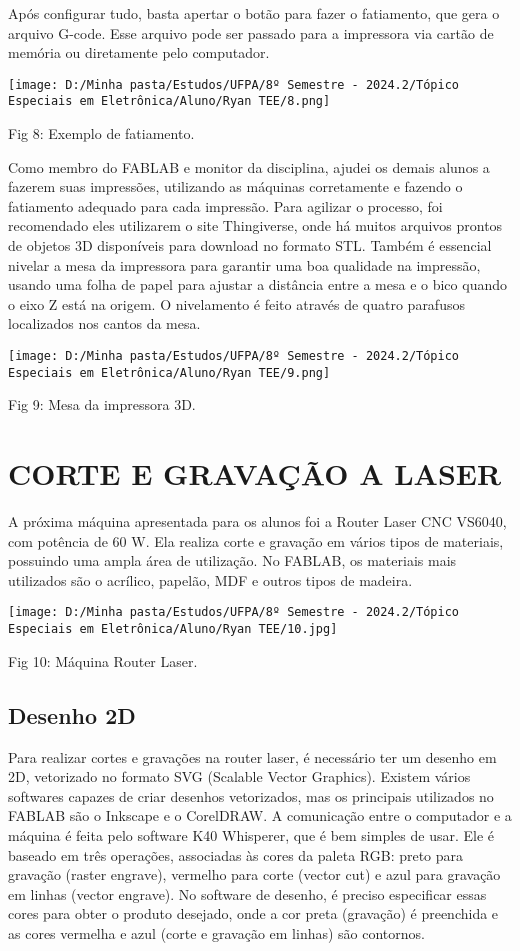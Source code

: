 \documentclass[
]{book}
\begin{document}
Após configurar tudo, basta apertar o botão para fazer o fatiamento, que gera o arquivo G-code. Esse arquivo pode ser passado para a impressora via cartão de memória ou diretamente pelo computador.

\texttt{[image: D:/Minha pasta/Estudos/UFPA/8º Semestre - 2024.2/Tópico Especiais em Eletrônica/Aluno/Ryan TEE/8.png]}

Fig 8: Exemplo de fatiamento.

Como membro do FABLAB e monitor da disciplina, ajudei os demais alunos a fazerem suas impressões, utilizando as máquinas corretamente e fazendo o fatiamento adequado para cada impressão. Para agilizar o processo, foi recomendado eles utilizarem o site Thingiverse, onde há muitos arquivos prontos de objetos 3D disponíveis para download no formato STL. Também é essencial nivelar a mesa da impressora para garantir uma boa qualidade na impressão, usando uma folha de papel para ajustar a distância entre a mesa e o bico quando o eixo Z está na origem. O nivelamento é feito através de quatro parafusos localizados nos cantos da mesa.

\texttt{[image: D:/Minha pasta/Estudos/UFPA/8º Semestre - 2024.2/Tópico Especiais em Eletrônica/Aluno/Ryan TEE/9.png]}

Fig 9: Mesa da impressora 3D.

\chapter{CORTE E GRAVAÇÃO A LASER}\label{corte-e-gravauxe7uxe3o-a-laser}

A próxima máquina apresentada para os alunos foi a Router Laser CNC VS6040, com potência de 60 W. Ela realiza corte e gravação em vários tipos de materiais, possuindo uma ampla área de utilização. No FABLAB, os materiais mais utilizados são o acrílico, papelão, MDF e outros tipos de madeira.

\texttt{[image: D:/Minha pasta/Estudos/UFPA/8º Semestre - 2024.2/Tópico Especiais em Eletrônica/Aluno/Ryan TEE/10.jpg]}

Fig 10: Máquina Router Laser.

\section{Desenho 2D}\label{desenho-2d}

Para realizar cortes e gravações na router laser, é necessário ter um desenho em 2D, vetorizado no formato SVG (Scalable Vector Graphics). Existem vários softwares capazes de criar desenhos vetorizados, mas os principais utilizados no FABLAB são o Inkscape e o CorelDRAW. A comunicação entre o computador e a máquina é feita pelo software K40 Whisperer, que é bem simples de usar. Ele é baseado em três operações, associadas às cores da paleta RGB: preto para gravação (raster engrave), vermelho para corte (vector cut) e azul para gravação em linhas (vector engrave). No software de desenho, é preciso especificar essas cores para obter o produto desejado, onde a cor preta (gravação) é preenchida e as cores vermelha e azul (corte e gravação em linhas) são contornos.
\end{document}
